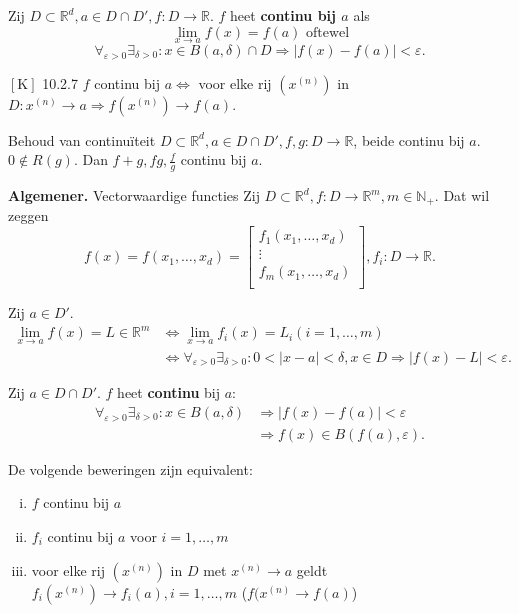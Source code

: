 \documentclass{2wa40summary}
\begin{document}
		 Zij $D \subset \mathbb{R}^d, a\in D\cap D',f:D\rightarrow \mathbb{R}$. $f$ heet \textbf{continu bij $a$} als \[\lim_{x\rightarrow a}f(x)=f(a) \text{ oftewel}\]
		\[\forall _{\varepsilon >0} \exists _{\delta >0}: x \in B(a,\delta)\cap D \Rightarrow |f(x)-f(a)|<\varepsilon.\]
		
		\theorem $\left[\text{K}\right]$ 10.2.7
			  $f$ continu bij $a \Leftrightarrow$ voor elke rij $(x^{(n)})$ in $D: x^{(n)}\rightarrow a \Rightarrow f(x^{(n)}) \rightarrow f(a).$
		
		\theorem Behoud van continu\"iteit
			  $D \subset \mathbb{R}^d, a \in D\cap D', f,g:D\rightarrow \mathbb{R}$, beide continu bij $a$. $0 \not \in R(g)$.
			  Dan $f+g, fg, \frac{f}{g}$ continu bij $a$.
		
        \textbf{Algemener.} Vectorwaardige functies
		  Zij $D \subset \mathbb{R}^d, f:D\rightarrow \mathbb{R}^m, m \in \mathbb{N}_+$. Dat wil zeggen
		\[f(x)=f(x_1,\dots , x_d) =
				\begin{bmatrix}
					f_1(x_1,\dots , x_d) \\
					\vdots \\
					f_m(x_1,\dots , x_d) \\
				\end{bmatrix}, f_i:D\rightarrow \mathbb{R}.\]
				
		 Zij $a \in D'$.
			\begin{align*}
				\lim_{x\rightarrow a}f(x)=L \in \mathbb{R}^m  &\Leftrightarrow \lim_{x\rightarrow a}f_i(x)=L_i (i=1,\dots ,m) \\
				&\Leftrightarrow \forall _{\varepsilon >0} \exists _{\delta >0}: 0<|x-a|<\delta, x\in D \Rightarrow |f(x)-L|<\varepsilon.
			\end{align*}
		
		 Zij $a \in D \cap D'$.
		  $f$ heet \textbf{continu} bij $a$:
		\begin{align*}
			\forall _{\varepsilon >0} \exists _{\delta >0}: x\in B(a,\delta) &\Rightarrow |f(x)-f(a)|<\varepsilon \\
			&\Rightarrow f(x) \in B(f(a),\varepsilon).
		\end{align*}
		
		 De volgende beweringen zijn equivalent:
			\begin{enumerate}[(i)]
				\item $f$ continu bij $a$
				\item $f_i$ continu bij $a$ voor $i=1,\dots ,m$
				\item voor elke rij $(x^{(n)})$ in $D$ met $x^{(n)}\rightarrow a$ geldt $f_i(x^{(n)}) \rightarrow f_i(a), i=1,\dots ,m$ ($f(x^{(n)}\rightarrow f(a)$)
			\end{enumerate}
		
\end{document}
